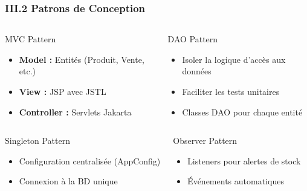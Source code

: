 \documentclass[11pt, aspectratio=169]{beamer}
\begin{document}
\begin{frame}
    \frametitle{III.2 Patrons de Conception}
    
    \begin{columns}[T]
        \begin{block}{MVC Pattern}
            \begin{itemize}
                \item \textbf{Model :} Entités (Produit, Vente, etc.)
                \item \textbf{View :} JSP avec JSTL
                \item \textbf{Controller :} Servlets Jakarta
            \end{itemize}
        \end{block}
        
        \begin{block}{DAO Pattern}
            \begin{itemize}
                \item Isoler la logique d'accès aux données
                \item Faciliter les tests unitaires
                \item Classes DAO pour chaque entité
            \end{itemize}
        \end{block}
    \end{columns}
    
    \vspace{1cm}
    
    \begin{columns}[T]
        \begin{block}{Singleton Pattern}
            \begin{itemize}
                \item Configuration centralisée (AppConfig)
                \item Connexion à la BD unique
            \end{itemize}
        \end{block}
        
        \begin{block}{Observer Pattern}
            \begin{itemize}
                \item Listeners pour alertes de stock
                \item Événements automatiques
            \end{itemize}
        \end{block}
    \end{columns}
\end{frame}
\end{document}
